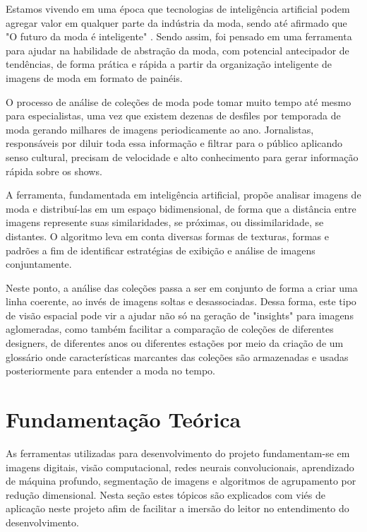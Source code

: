 \documentclass[12pt]{report}
\begin{document}
Estamos vivendo em uma época que tecnologias de inteligência artificial podem agregar valor em qualquer parte da indústria da moda, sendo até afirmado que "O futuro da moda é inteligente" \cite{Forbes}. Sendo assim, foi pensado em uma ferramenta para ajudar na habilidade de abstração da moda, com potencial antecipador de tendências, de forma prática e rápida a partir da organização inteligente de imagens de moda em formato de painéis.

O processo de análise de coleções de moda pode tomar muito tempo até mesmo para especialistas, uma vez que existem dezenas de desfiles por temporada de moda gerando milhares de imagens periodicamente ao ano. Jornalistas, responsáveis por diluir toda essa informação e filtrar para o público aplicando senso cultural, precisam de velocidade e alto conhecimento para gerar informação rápida sobre os shows. 

A ferramenta, fundamentada em inteligência artificial, propõe analisar imagens de moda e distribuí-las em um espaço bidimensional, de forma que a distância entre imagens represente suas similaridades, se próximas, ou dissimilaridade, se distantes. O algoritmo leva em conta diversas formas de texturas, formas e padrões a fim de identificar estratégias de exibição e análise de imagens conjuntamente.

Neste ponto, a análise das coleções passa a ser em conjunto de forma a criar uma linha coerente, ao invés de imagens soltas e desassociadas. Dessa forma, este tipo de visão espacial pode vir a ajudar não só na geração de "insights" para imagens aglomeradas, como também facilitar a comparação de coleções de diferentes designers, de diferentes anos ou diferentes estações por meio da criação de um glossário onde características marcantes das coleções são armazenadas e usadas posteriormente para entender a moda no tempo.

\chapter{Fundamentação Teórica}
\label{cha:fund-teor}

As ferramentas utilizadas para desenvolvimento do projeto fundamentam-se em imagens digitais, visão computacional, redes neurais convolucionais, aprendizado de máquina profundo, segmentação de imagens e algoritmos de agrupamento por redução dimensional. Nesta seção estes tópicos são explicados com viés de aplicação neste projeto afim de facilitar a imersão do leitor no entendimento do desenvolvimento.
\end{document}
